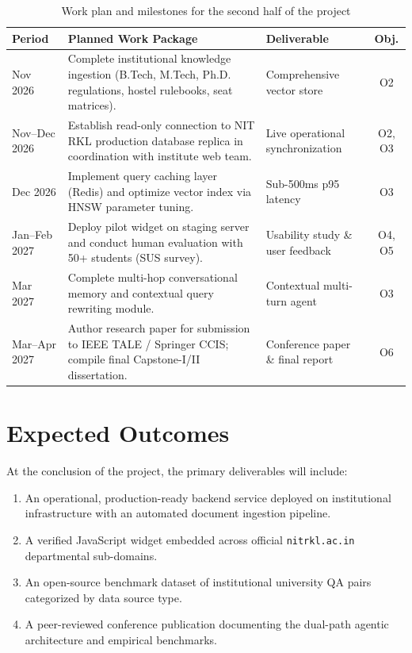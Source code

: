 \documentclass[12pt,a4paper]{report}
\begin{document}
\begin{table}[htbp]
\centering
\small
\caption{Work plan and milestones for the second half of the project}
\label{tab:remaining_work}
\begin{tabularx}{\textwidth}{lXlc}
\toprule
\textbf{Period} & \textbf{Planned Work Package} & \textbf{Deliverable} & \textbf{Obj.} \\
\midrule
Nov 2026 & Complete institutional knowledge ingestion (B.Tech, M.Tech, Ph.D. regulations, hostel rulebooks, seat matrices). & Comprehensive vector store & O2 \\
\addlinespace
Nov--Dec 2026 & Establish read-only connection to NIT RKL production database replica in coordination with institute web team. & Live operational synchronization & O2, O3 \\
\addlinespace
Dec 2026 & Implement query caching layer (Redis) and optimize vector index via HNSW parameter tuning. & Sub-500ms p95 latency & O3 \\
\addlinespace
Jan--Feb 2027 & Deploy pilot widget on staging server and conduct human evaluation with 50+ students (SUS survey). & Usability study \& user feedback & O4, O5 \\
\addlinespace
Mar 2027 & Complete multi-hop conversational memory and contextual query rewriting module. & Contextual multi-turn agent & O3 \\
\addlinespace
Mar--Apr 2027 & Author research paper for submission to IEEE TALE / Springer CCIS; compile final Capstone-I/II dissertation. & Conference paper \& final report & O6 \\
\bottomrule
\end{tabularx}
\end{table}

\section{Expected Outcomes}
At the conclusion of the project, the primary deliverables will include:
\begin{enumerate}
    \item An operational, production-ready backend service deployed on institutional infrastructure with an automated document ingestion pipeline.
    \item A verified JavaScript widget embedded across official \texttt{nitrkl.ac.in} departmental sub-domains.
    \item An open-source benchmark dataset of institutional university QA pairs categorized by data source type.
    \item A peer-reviewed conference publication documenting the dual-path agentic architecture and empirical benchmarks.
\end{enumerate}
\end{document}
